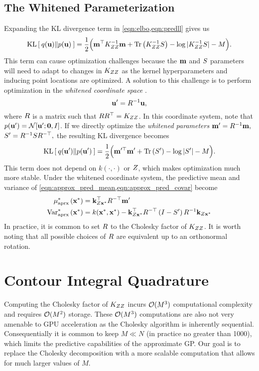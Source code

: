 \subsection{The Whitened Parameterization}

Expanding the KL divergence term in \cref{eqn:elbo,eqn:predll} gives us
%
\begin{equation}
	\kl{ q(\bu) }{ p(\bu) } = \frac{1}{2} \Bigl( \bm^\top \bK_{\bZ\bZ}^{-1} \bm + \tr{ \bK_{\bZ\bZ}^{-1} \bS } - \log \vert \bK_{\bZ\bZ}^{-1} \bS \vert - M \Bigr).
	\label{eqn:kldiv}
\end{equation}
%
This term can cause optimization challenges because the $\mathbf{m}$ and $S$ parameters will need to adapt to changes in $K_{ZZ}$ as the kernel hyperparameters and inducing point locations are optimized.
A solution to this challenge is to perform optimization in the \emph{whitened coordinate space} \cite{matthews2017scalable}.
\[ \mathbf{u}' = R^{-1} \mathbf{u}, \]
where $R$ is a matrix such that $R R^\top = K_{ZZ}$.
In this coordinate system, note that $p(\bu') = \normaldist{ \bu'; \bzero}{\bI}$.
If we directly optimize the \emph{whitened parameters} $\mathbf{m}' = R^{-1} \mathbf{m},$ $S' = R^{-1} S R^{-\top},$
the resulting KL divergence becomes
%
\begin{equation}
	\kl{ q(\bu') }{ p(\bu') } = \frac{1}{2} \Bigl( \bm^{\prime \top} \bm' + \tr{ \bS' } - \log \vert \bS' \vert - M \Bigr).
	\label{eqn:kldiv_whitened}
\end{equation}
%
This term does not depend on $k(\cdot,\cdot)$ or $Z$, which makes optimization much more stable.
Under the whitened coordinate system, the predictive mean and variance of \cref{eqn:approx_pred_mean,eqn:approx_pred_covar} become
%
\begin{align}
  \mu^*_\text{aprx} \left( \mathbf{x}^* \right) &= \mathbf{k}_{Z\mathbf{x}^*}^\top R^{-\top} \mathbf{m}'
  \label{eqn:approx_pred_mean_white} \\
  \text{Var}^*_\text{aprx} \left( \mathbf{x}^* \right) &= k(\mathbf{x}^*, \mathbf{x}^*) -
    \mathbf{k}_{Z\mathbf{x}^*}^\top R^{-\top} \left( I - S' \right) R^{-1} \mathbf{k}_{Z\mathbf{x}^*}
  \label{eqn:approx_pred_covar_white}
\end{align}
%
In practice, it is common to set $R$ to the Cholesky factor of $K_{ZZ}$.
It is worth noting that all possible choices of $R$ are equivalent up to an orthonormal rotation.


\section{Contour Integral Quadrature}
Computing the Cholesky factor of $K_{ZZ}$ incurs $\bigo{M^3}$ computational complexity and requires $\bigo{M^2}$ storage.
These $\bigo{M^3}$ computations are also not very amenable to GPU acceleration as the Cholesky algorithm is inherently sequential.
Consequentially it is common to keep $M \ll N$ (in practice no greater than 1000), which limits the predictive capabilities of the approximate GP.
Our goal is to replace the Cholesky decomposition with a more scalable computation that allows for much larger values of $M$.


